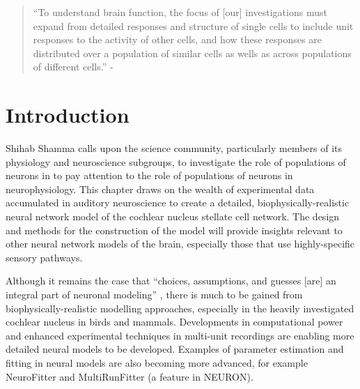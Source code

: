 

\begin{quotation}
  ``To understand brain function, the focus of [our] investigations must
  expand from detailed responses and structure of single cells to
  include unit responses to the activity of other cells, and how these
  responses are distributed over a population of similar cells as
  wells as across populations of different cells.''  - \textit{\citet[,p.TODO]{Shamma:1998}}
\end{quotation}


\section{Introduction}

Shihab Shamma calls upon the science community, particularly members
of its physiology and neuroscience subgroups, to investigate the role
of populations of neurons in to pay attention to the role of
populations of neurons in neurophysiology. This chapter draws on the wealth of experimental data accumulated in auditory
neuroscience to create a detailed, biophysically-realistic
neural network model of the cochlear nucleus stellate cell network.  The
design and methods for the construction of the model will provide
insights relevant to other neural network models of the brain, especially those
that use highly-specific sensory pathways. 


Although it remains the case that ``choices, assumptions, and guesses [are] an
integral part of neuronal modeling'' \citep{SegevBurkeEtAl:1998} , there is much to be gained from
biophysically-realistic modelling approaches, especially in the heavily
investigated cochlear nucleus in birds and mammals. Developments in
computational power and enhanced experimental techniques in multi-unit
recordings are enabling more detailed neural models to be developed. Examples of parameter
estimation and fitting in neural models are also becoming more advanced, for
example NeuroFitter \citep{VanAchardEtAl:2007} and MultiRunFitter (a feature in
NEURON).

